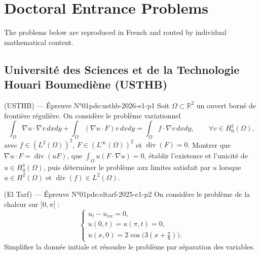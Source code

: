 \chapter{Doctoral Entrance Problems}
\label{ch:problems}

The problems below are reproduced in French and routed by individual mathematical content.
\newpage

\section{Université des Sciences et de la Technologie Houari Boumediène (USTHB)}
\begin{problem}{(USTHB) — Épreuve N°01}{pde:usthb-2026-e1-p1}
Soit $\Omega\subset\mathbb R^2$ un ouvert borné de frontière régulière. On considère le problème variationnel
$$\int_\Omega\nabla u\cdot\nabla v\,dxdy+\int_\Omega(\nabla u\cdot F)v\,dxdy=\int_\Omega f\cdot\nabla v\,dxdy,\qquad\forall v\in H_0^1(\Omega),$$
avec $f\in(L^2(\Omega))^2$, $F\in(L^\infty(\Omega))^2$ et $\operatorname{div}(F)=0$. Montrer que $\nabla u\cdot F=\operatorname{div}(uF)$, que $\int_\Omega u(F\cdot\nabla u)=0$, établir l'existence et l'unicité de $u\in H_0^1(\Omega)$, puis déterminer le problème aux limites satisfait par $u$ lorsque $u\in H^2(\Omega)$ et $\operatorname{div}(f)\in L^2(\Omega)$.
\end{problem}
\newpage
\begin{problem}{(El Tarf) — Épreuve N°01}{pde:eltarf-2025-e1-p2}
On considère le problème de la chaleur sur $]0,\pi[$ :
$$\begin{cases}u_t-u_{xx}=0,\\u(0,t)=u(\pi,t)=0,\\u(x,0)=2\cos\!\bigl(3(x+\tfrac\pi6)\bigr).\end{cases}$$
Simplifier la donnée initiale et résoudre le problème par séparation des variables.
\end{problem}
\newpage

